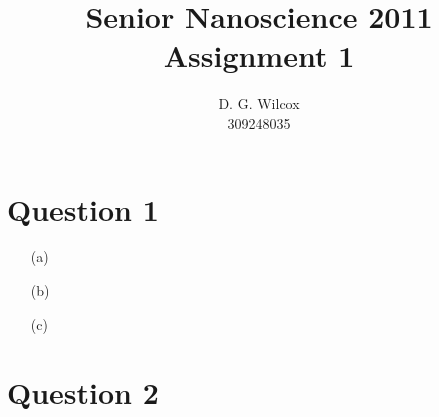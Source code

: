 \documentclass[10pt,a4paper]{article}
\title{Senior Nanoscience 2011 Assignment 1}
\date{}
\author{D. G. Wilcox \\
		309248035}
\begin{document}
\maketitle

\section*{Question 1}

\begin{itemize}
	\item[(a)]
	\item[(b)]
	\item[(c)]
\end{itemize}

\section*{Question 2}
\end{document}
